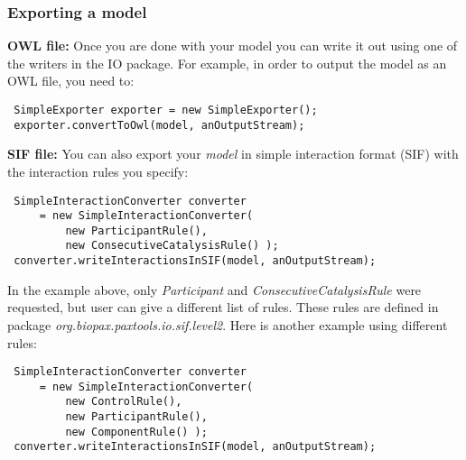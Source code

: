 \documentclass[10pt]{article}
\newenvironment{mylisting}
{\begin{list}{}{\setlength{\leftmargin}{2em}}\item\small\bfseries}
{\end{list}}
\begin{document}
\subsubsection{Exporting a model}
%
%
\begin{enumerate}
\item \textbf{OWL file:}
Once you are done with your model you can write it out using one of the writers in the IO package. For example, in order to output the model as an OWL file, you need to:

\begin{mylisting}
\begin{verbatim}
 SimpleExporter exporter = new SimpleExporter();
 exporter.convertToOwl(model, anOutputStream);
\end{verbatim}
\end{mylisting}

\item \textbf{SIF file:}
You can also export your \textit{model} in simple interaction format (SIF) with the interaction rules you specify:

\begin{mylisting}
\begin{verbatim}
 SimpleInteractionConverter converter
     = new SimpleInteractionConverter(
         new ParticipantRule(),
         new ConsecutiveCatalysisRule() );
 converter.writeInteractionsInSIF(model, anOutputStream);
\end{verbatim}
\end{mylisting}
 
In the example above, only \textit{Participant} and \textit{ConsecutiveCatalysisRule} were requested, but user can give a different list of rules. These rules are defined in package \textit{org.biopax.paxtools.io.sif.level2}. Here is another example using different rules:

\begin{mylisting}
\begin{verbatim}
 SimpleInteractionConverter converter
     = new SimpleInteractionConverter(
         new ControlRule(),
         new ParticipantRule(),
         new ComponentRule() );
 converter.writeInteractionsInSIF(model, anOutputStream);
\end{verbatim}
\end{mylisting}

\end{enumerate}
%
%
\end{document}
